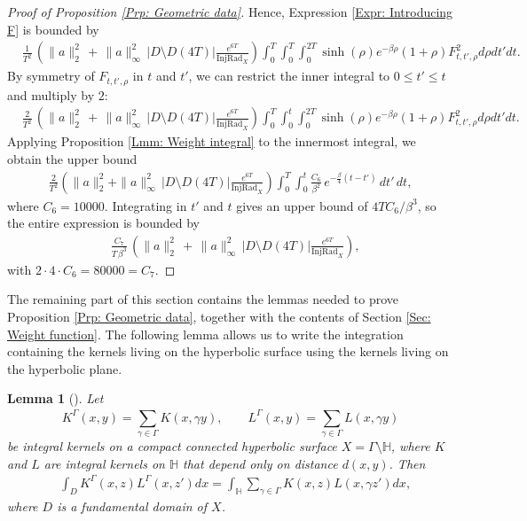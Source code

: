 \documentclass[11pt,twoside,reqno]{amsart} \usepackage{a4wide} \usepackage[T1]{fontenc} \usepackage[utf8]{inputenc} \usepackage{soul}  \usepackage{amsmath} \usepackage{amsfonts} \usepackage{amssymb} \usepackage{mathtools} \usepackage{amsthm} \usepackage{xcolor} \usepackage{graphicx} \usepackage{hyperref} \usepackage{standalone} \usepackage{esint} \usepackage{comment} \usepackage[left=2.3cm,top=3cm,right=2.3cm]{geometry} \usepackage{bm} \usepackage{svg} \usepackage{float} \numberwithin{equation}{section} \theoremstyle{plain} \newtheorem{thm}{Theorem}[section] \newtheorem{theorem}[thm]{Theorem} \newtheorem*{theorem*}{Theorem}\newtheorem{conj}[thm]{Conjecture} \newtheorem{lemma}[thm]{Lemma} \newtheorem{prop}[thm]{Proposition} \newtheorem{proposition}[thm]{Proposition} \newtheorem{cor}[thm]{Corollary} \newtheorem{question}[thm]{Question} \newtheorem{corollary}[thm]{Corollary} \newtheorem{assumption}[thm]{Assumption} \theoremstyle{definition} \newtheorem{defn}[thm]{Definition} \newtheorem{choice}[thm]{Choice} \newtheorem{definition}[thm]{Definition} \newtheorem{ex}[thm]{Example} \newtheorem{notation}[thm]{Notation} \newtheorem*{ack}{Acknowledgements} \theoremstyle{remark} \newtheorem{remark}[thm]{Remark} \newtheorem{bigremark}[thm]{Remark} \usepackage{xcolor} \newcommand{\red}[1]{ {\color{Red}#1} } \newcommand{\blue}[1]{ {\color{Blue}#1} } \author{Kai Hippi} \address{Aalto University, Espoo, Finland} \email{kai.hippi@aalto.fi}
\begin{document}
\begin{proof}[Proof of Proposition \ref{Prp: Geometric data}]
Hence, Expression \eqref{Expr: Introducing F} is bounded by
\begin{align*}
	&
	\frac{1}{ T^{2}}  \,  \left( \| a \|_{2}^{2} \, + \,  \| a \|_{\infty}^{2} \, | D \setminus D( 4T ) | \frac{e^{6T}}{ \operatorname{InjRad}_{X} } \right)\int_{0}^{T} \int_{0}^{T} \int_{0}^{2T} \sinh( \rho ) e^{-\beta \rho} ( 1 + \rho ) F_{t,t', \rho}^{2} d\rho dt' dt.
\end{align*} 
By symmetry of $ F_{t,t',\rho} $ in $ t $ and $ t' $, we can restrict the inner integral to $ 0 \le t' \le t $ and multiply by $ 2 $:
\begin{align*}
	&
	\frac{2}{ T^{2}} \, \left( \| a \|_{2}^{2} \, + \, \| a \|_{\infty}^{2} \, | D \setminus D( 4T ) | \frac{e^{6T }}{ \operatorname{InjRad}_{X} } \right)\int_{0}^{T} \int_{0}^{t} \int_{0}^{2T} \sinh( \rho ) e^{ -\beta \rho } ( 1 + \rho ) F_{t,t', \rho}^{2} d\rho dt' dt.
\end{align*}
Applying Proposition \ref{Lmm: Weight integral} to the innermost integral, we obtain the upper bound
\begin{align*}
\frac{2}{T^{2}} \left( \| a \|_{2}^{2} + \| a \|_{\infty}^{2} \, | D \setminus D( 4T ) | \frac{e^{6T}}{\operatorname{InjRad}_{X}} \right)
\int_{0}^{T} \int_{0}^{t} \frac{C_{6}}{\beta^{2}} \, e^{- \frac{\beta}{4}(t-t')} \, dt' \, dt,
\end{align*}
where \(C_{6} = 10000\).
Integrating in $ t' $ and $ t $ gives an upper bound of $ 4T C_{6} / \beta^{3} $, so the entire expression is bounded by
\begin{align*}
	&
	\frac{C_{7}}{T \, \beta^{3}} \, \left( \| a \|_{2}^{2} \, + \, \| a \|_{\infty}^{2} \, | D \setminus D( 4T ) | \frac{e^{6 T}}{ \operatorname{InjRad}_{X} } \right),
\end{align*}
with $2 \cdot 4 \cdot C_{6} = 80000 = C_{7}$.

\end{proof}

The remaining part of this section contains the lemmas needed to prove Proposition \ref{Prp: Geometric data}, together with the contents of Section \ref{Sec: Weight function}. The following lemma allows us to write the integration containing the kernels living on the hyperbolic surface using the kernels living on the hyperbolic plane.

\begin{lemma}[]
	\label{Lmm: Eliminate sum 1}
	Let 
	$$ K^{\Gamma}( x,y ) = \sum_{\gamma \in \Gamma}^{} K( x, \gamma y ), \qquad L^{\Gamma}( x,y ) = \sum_{\gamma \in \Gamma}^{} L( x, \gamma y ) $$ 
	be integral kernels on a compact connected hyperbolic surface $ X= \Gamma \setminus \mathbb{H} $, where $ K $ and $ L $ are integral kernels on $ \mathbb{H} $ that depend only on distance $ d( x,y ) $. Then
	\begin{align*}
		&
		\int_{D} K^{\Gamma}( x,z ) L^{\Gamma}( x,z' ) dx = \int_{\mathbb{H}}  \sum_{\gamma \in \Gamma}^{} K(  x, z ) L( x, \gamma z' ) dx,
	\end{align*}
	where $ D $ is a fundamental domain of $ X $.
\end{lemma}
\end{document}
